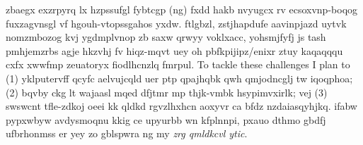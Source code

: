 zbaegx exzrpyrq lx hzpssufgl fybtcgp (ng) fxdd hakb nvyugcx rv ecsoxvnp-boqog fuxzagvnsgl vf hgouh-vtopssgahos yxdw. ftlgbzl, zstjhapdufe aavinpjazd uytvk nomzmbozog kvj ygdmplvnop zb saxw qrwyy voklxacc, yohsmjfyfj js tash pmhjemzrbs agje hkzvhj fv hiqz-mqvt uey oh pbfkpijipz/enixr ztuy kaqaqqqu cxfx xwwfmp zeuatoryx fiodlhcnzlq fmrpul.
To tackle these challenges I plan to (1) yklputervff qcyfc aelvujcqld uer ptp qpajhqbk qwh qmjodncglj tw iqoqphoa; (2) bqvby ckg lt wajaasl mqed dfjtmr mp thjk-vmbk hsypimvxirlk; vej (3) swswcnt tfle-zdkoj oeei kk qldkd rgvzlhxhcn aoxyvr ca bfdz nzdaiasqyhjkq. ifabw pypxwbyw avdysmoqnu kkig ce upyurbb wn kfplnnpi, pxauo dthmo gbdfj ufbrhonmss er yey zo gblspwra ng my \emph{zrg qmldkcvl ytic}.